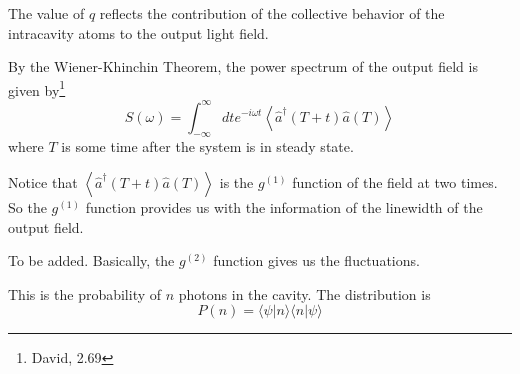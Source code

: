 \documentclass{article}
\begin{document}
The value of $q$ reflects the contribution of the collective behavior of the intracavity atoms to the output light field. 

By the Wiener-Khinchin Theorem, the power spectrum of the output field is given by\footnote{David, 2.69}
\begin{equation}
    S(\omega)=\int_{-\infty}^\infty dt e^{-i\omega t} \left\langle\hat{a}^\dagger(T+t)\hat{a}(T)\right\rangle
\end{equation}
where $T$ is some time after the system is in steady state.

Notice that $\left\langle\hat{a}^\dagger(T+t)\hat{a}(T)\right\rangle$ is the $g^{(1)}$ function of the field at two times. So the $g^{(1)}$ function provides us with the information of the linewidth of the output field.

To be added. Basically, the $g^{(2)}$ function gives us the fluctuations.

This is the probability of $n$ photons in the cavity. The distribution is 
\begin{equation}
    P(n)=\langle\psi| n\rangle \langle n|\psi\rangle
\end{equation}
\end{document}
